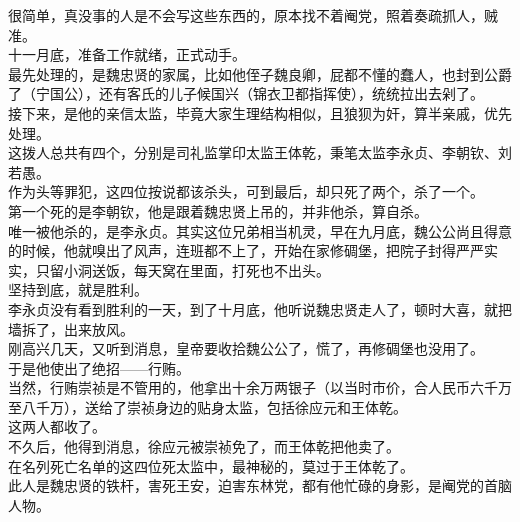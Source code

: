 \begin{multicols}{\theparacolNo}
很简单，真没事的人是不会写这些东西的，原本找不着阉党，照着奏疏抓人，贼准。\\

十一月底，准备工作就绪，正式动手。\\

最先处理的，是魏忠贤的家属，比如他侄子魏良卿，屁都不懂的蠢人，也封到公爵了（宁国公），还有客氏的儿子候国兴（锦衣卫都指挥使），统统拉出去剁了。\\

接下来，是他的亲信太监，毕竟大家生理结构相似，且狼狈为奸，算半亲戚，优先处理。\\

这拨人总共有四个，分别是司礼监掌印太监王体乾，秉笔太监李永贞、李朝钦、刘若愚。\\

作为头等罪犯，这四位按说都该杀头，可到最后，却只死了两个，杀了一个。\\

第一个死的是李朝钦，他是跟着魏忠贤上吊的，并非他杀，算自杀。\\

唯一被他杀的，是李永贞。其实这位兄弟相当机灵，早在九月底，魏公公尚且得意的时候，他就嗅出了风声，连班都不上了，开始在家修碉堡，把院子封得严严实实，只留小洞送饭，每天窝在里面，打死也不出头。\\

坚持到底，就是胜利。\\

李永贞没有看到胜利的一天，到了十月底，他听说魏忠贤走人了，顿时大喜，就把墙拆了，出来放风。\\

刚高兴几天，又听到消息，皇帝要收拾魏公公了，慌了，再修碉堡也没用了。\\

于是他使出了绝招——行贿。\\

当然，行贿崇祯是不管用的，他拿出十余万两银子（以当时市价，合人民币六千万至八千万），送给了崇祯身边的贴身太监，包括徐应元和王体乾。\\

这两人都收了。\\

不久后，他得到消息，徐应元被崇祯免了，而王体乾把他卖了。\\

在名列死亡名单的这四位死太监中，最神秘的，莫过于王体乾了。\\

此人是魏忠贤的铁杆，害死王安，迫害东林党，都有他忙碌的身影，是阉党的首脑人物。\\


\end{multicols}
